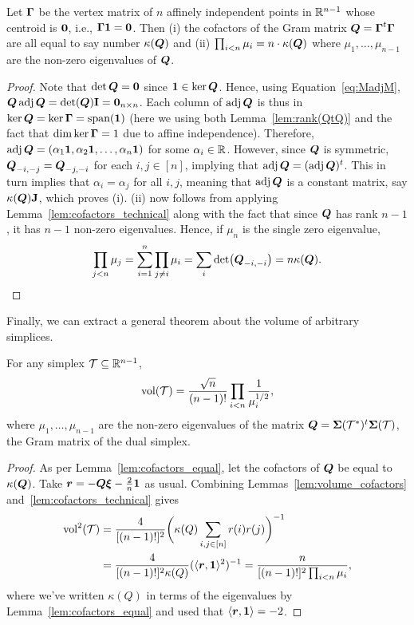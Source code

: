 \begin{lemma}
	\label{lem:cofactors_equal}
	Let $\vb*{\Gamma}$ be the vertex matrix of $n$ affinely independent points in  $\mathbb{R}^{n-1}$ whose  centroid is $\vb{0}$,  i.e., $\vb*{\Gamma}\vb{1}=\vb{0}$. Then (i) the cofactors of the Gram matrix  $\vb*{Q}=\vb*{\Gamma}^t\vb*{\Gamma}$ are all equal to say number $\kappa(\vb*{Q})$ and (ii) $\prod_{i<n}\mu_i = n\cdot \kappa(\vb*{Q})$  where $\mu_1,\dots,\mu_{n-1}$ are the non-zero eigenvalues of $\vb*{Q}$. 
\end{lemma}
\begin{proof}
	Note that $\det\vb*{Q}=\vb{0}$ since  $\vb{1}\in\ker\vb*{Q}$. Hence, using Equation~\eqref{eq:MadjM}, $\vb*{Q}\operatorname{\textnormal{adj}}\vb*{Q} = \det(\vb*{Q})\vb{I}=\vb{0}_{n\times n}$. Each column  of $\operatorname{\textnormal{adj}}\vb*{Q}$ is  thus in $\ker\vb*{Q}=\ker\vb*{\Gamma}=\textnormal{span}(\vb{1})$ (here we using both  Lemma~\ref{lem:rank(QtQ)} and the fact that $\dim\ker\vb*{\Gamma}=1$ due to affine independence). Therefore, $\operatorname{\textnormal{adj}}\vb*{Q} = (\alpha_1\vb{1},\alpha_2\vb{1},\dots,\alpha_n\vb{1})$ for some $\alpha_i\in\mathbb{R}$. However, since  $\vb*{Q}$ is symmetric, $\vb*{Q}_{-i,-j}=\vb*{Q}_{-j,-i}$ for each $i,j\in[n]$, implying that $\operatorname{\textnormal{adj}}\vb*{Q} = (\operatorname{\textnormal{adj}}\vb*{Q})^t$. This in turn implies that $\alpha_i=\alpha_j$  for all $i,j$, meaning that $\operatorname{\textnormal{adj}}\vb*{Q}$ is a constant matrix, say $\kappa(\vb*{Q})\vb{J}$,  which proves (i). (ii) now follows from applying  Lemma~\ref{lem:cofactors_technical} along with the fact that  since $\vb*{Q}$ has rank $n-1$, it has $n-1$ non-zero eigenvalues. Hence, if $\mu_n$  is the single zero eigenvalue, 
	\begin{equation*}
	\prod_{j<n}\mu_j = \sum_{i=1}^n \prod_{j\neq i}\mu_i = \sum_i \det(\vb*{Q}_{-i,-i}) = n\kappa(\vb*{Q}).\qedhere 
	\end{equation*}
\end{proof}


Finally, we can  extract a general theorem about the volume of arbitrary simplices.  


\begin{theorem}
	\label{thm:simplex_volume}
	For any simplex $\mathcal{T}\subseteq\mathbb{R}^{n-1}$, 
	\begin{equation*}
	\textnormal{vol}(\mathcal{T}) = \frac{\sqrt{n}}{(n-1)!}\prod_{i<n}\frac{1}{\mu_i^{1/2}},
	\end{equation*}
	where $\mu_1,\dots,\mu_{n-1}$ are the non-zero eigenvalues of the matrix   $\vb*{Q}=\boldsymbol{\Sigma}(\mathcal{T}^*)^t\boldsymbol{\Sigma}(\mathcal{T})$, the Gram matrix of the dual simplex. 
\end{theorem}
\begin{proof}
As per Lemma~\ref{lem:cofactors_equal}, let the cofactors of  $\vb*{Q}$ be  equal to $\kappa(\vb*{Q})$. Take  $\vb*{r}=-\vb*{Q}\vb*{\xi}-\frac{2}{n}\vb{1}$  as usual.  
Combining Lemmas~\ref{lem:volume_cofactors} and~\ref{lem:cofactors_technical} gives  
\begin{align*}
\textnormal{vol}^2(\mathcal{T}) &= \frac{4}{[(n-1)!]^2}\bigg(\kappa(Q)\sum_{i,j\in[n]} r(i)r(j)\bigg)^{-1} \\
&= \frac{4}{[(n-1)!]^2\kappa(Q)}(\langle \vb*{r},\vb{1}\rangle^2)^{-1} = \frac{n}{[(n-1)!]^2\prod_{i<n}\mu_i},
\end{align*}
where we've written $\kappa(Q)$ in terms of the eigenvalues by Lemma~\ref{lem:cofactors_equal} and used that $\langle \vb*{r},\vb{1}\rangle = -2$. 
\end{proof}

